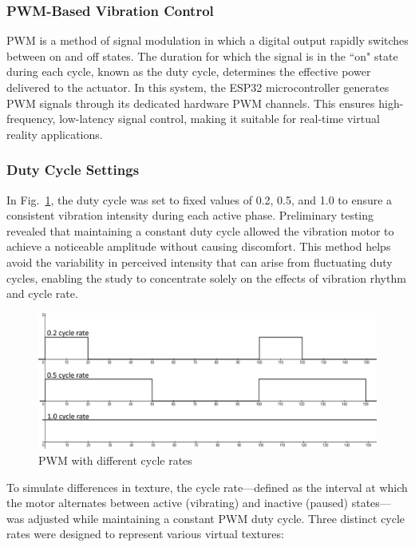 \subsubsection{PWM-Based Vibration Control}
PWM is a method of signal modulation in which a digital output rapidly switches between on and off states. The duration for which the signal is in the ``on" state during each cycle, known as the duty cycle, determines the effective power delivered to the actuator. In this system, the ESP32 microcontroller generates PWM signals through its dedicated hardware PWM channels. This ensures high-frequency, low-latency signal control, making it suitable for real-time virtual reality applications.

\newpage
\subsubsection{Duty Cycle Settings}
In Fig.~\ref{fig:pwm_3}, the duty cycle was set to fixed values of 0.2, 0.5, and 1.0 to ensure a consistent vibration intensity during each active phase. Preliminary testing revealed that maintaining a constant duty cycle allowed the vibration motor to achieve a noticeable amplitude without causing discomfort. This method helps avoid the variability in perceived intensity that can arise from fluctuating duty cycles, enabling the study to concentrate solely on the effects of vibration rhythm and cycle rate.

\begin{figure}[H]\centering
	\includegraphics[width=1\textwidth]{Pictures/PWM_3.png}%
	\caption{PWM with different cycle rates}\label{fig:pwm_3}%
	
\end{figure}

To simulate differences in texture, the cycle rate—defined as the interval at which the motor alternates between active (vibrating) and inactive (paused) states—was adjusted while maintaining a constant PWM duty cycle. Three distinct cycle rates were designed to represent various virtual textures:

